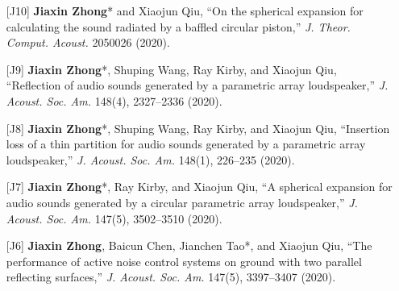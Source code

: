 \documentclass[10pt,a4paper,ragged2e,withhyper]{altacv}
\newcommand{\PubJournal}[1]{\textit{#1}}
\newcommand{\PubTitle}[1]{``{#1,}''}
\newcommand{\PubCorAuthor}[1]{#1*}
\newcommand{\PubMe}[1]{\textbf{#1}}
\begin{document}
\begin{paracol}{1}
\begin{itemize}[leftmargin = 30pt]
    \item[{[J10]}]
        \PubCorAuthor{\PubMe{Jiaxin Zhong}} and Xiaojun Qiu,
        \PubTitle{On the spherical expansion for calculating the sound radiated by a baffled circular piston} 
        \PubJournal{J. Theor. Comput. Acoust.}
        2050026 (2020).
        \href{https://doi.org/10.1142/S2591728520500267}{\color{accent}\aiDoi}
        \href{https://github.com/JiaxinZhong/JiaxinZhong.github.io/raw/master/publications/journal/Zhong2020-JTCA-Piston_radiation.pdf}{\color{accent}\faFilePdf[regular]}

    \item[{[J9]}]
        \PubCorAuthor{\textbf{Jiaxin Zhong}}, Shuping Wang, Ray Kirby, and Xiaojun Qiu, 
        \PubTitle{Reflection of audio sounds generated by a parametric array loudspeaker} 
        \PubJournal{J. Acoust. Soc. Am.}
        148(4), 2327--2336 (2020).
        \href{https://doi.org/10.1121/10.0002161}{\color{accent}\aiDoi}
        \href{https://github.com/JiaxinZhong/JiaxinZhong.github.io/raw/master/publications/journal/Zhong2020-JASA-PAL_reflection.pdf}{\color{accent}\faFilePdf[regular]}

    \item[{[J8]}]
        \PubCorAuthor{\textbf{Jiaxin Zhong}}, Shuping Wang, Ray Kirby, and Xiaojun Qiu, 
        \PubTitle{Insertion loss of a thin partition for audio sounds generated by a parametric array loudspeaker}
        \PubJournal{J. Acoust. Soc. Am.}
        148(1), 226--235 (2020).
        \href{https://doi.org/10.1121/10.0001568}{\color{accent}\aiDoi}
        \href{https://github.com/JiaxinZhong/JiaxinZhong.github.io/raw/master/publications/journal/Zhong2020-JASA-PAL_insertion_loss.pdf}{\color{accent}\faFilePdf[regular]}

    \item[{[J7]}]
        \PubCorAuthor{\textbf{Jiaxin Zhong}}, Ray Kirby, and Xiaojun Qiu, 
        \PubTitle{A spherical expansion for audio sounds generated by a circular parametric array loudspeaker}
        \PubJournal{J. Acoust. Soc. Am.}
        147(5), 3502--3510 (2020).
        \href{https://doi.org/10.1121/10.0001261}{\color{accent}\aiDoi}
        \href{https://github.com/JiaxinZhong/JiaxinZhong.github.io/raw/master/publications/journal/Zhong2020-JASA-PAL_SWE.pdf}{\color{accent}\faFilePdf[regular]}

    \item[{[J6]}] \textbf{Jiaxin Zhong}, Baicun Chen, \PubCorAuthor{Jianchen Tao}, and Xiaojun Qiu,
        \PubTitle{The performance of active noise control systems on ground with two parallel reflecting surfaces}
        \PubJournal{J. Acoust. Soc. Am.}
        147(5), 3397--3407 (2020).
        \href{https://doi.org/10.1121/10.0001227}{\color{accent}\aiDoi}
        \href{https://github.com/JiaxinZhong/JiaxinZhong.github.io/raw/master/publications/journal/Zhong2020-JASA-ANC_parallel_surface.pdf}{\color{accent}\faFilePdf[regular]}


\end{itemize}
\end{paracol}
\end{document}
